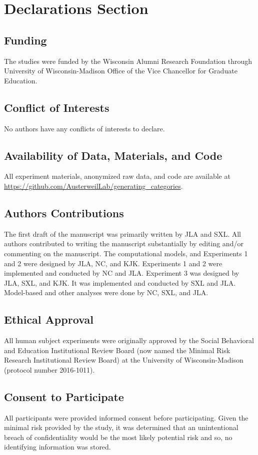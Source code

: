 \documentclass[pdflatex,sn-apa]{sn-jnl}%
\theoremstyle{thmstyleone}%
\theoremstyle{thmstyletwo}%
\theoremstyle{thmstylethree}%
\begin{document}
\section{Declarations Section}
\subsection{Funding}
The studies were funded by the Wisconsin Alumni Research Foundation through University of Wisconsin-Madison Office of the Vice Chancellor for Graduate Education.

\subsection{Conflict of Interests}
No authors have any conflicts of interests to declare.


\subsection{Availability of Data,  Materials, and Code }
All experiment materials, anonymized raw data, and code are available at \url{https://github.com/AusterweilLab/generating_categories}.

\subsection{Authors Contributions}
The first draft of the manuscript was primarily written by JLA and SXL. All authors contributed to writing the manuscript substantially by editing and/or commenting on the manuscript. The computational models, and Experiments 1 and 2 were designed by JLA, NC, and KJK. Experiments 1 and 2 were implemented and conducted by NC and JLA. Experiment 3 was designed by JLA, SXL, and KJK. It was implemented and conducted by SXL and JLA. Model-based and other analyses were done by NC, SXL, and JLA. 

\subsection{Ethical Approval}
All human subject experiments were originally approved by the Social Behavioral and Education Institutional Review Board (now named the Minimal Risk Research Institutional Review Board) at the University of Wisconsin-Madison (protocol number 2016-1011).

\subsection{Consent to Participate}
All participants were provided informed consent before participating. Given the minimal risk provided by the study, it was determined that an unintentional breach of confidentiality would be the most likely potential risk and so, no identifying information was stored.
\end{document}
